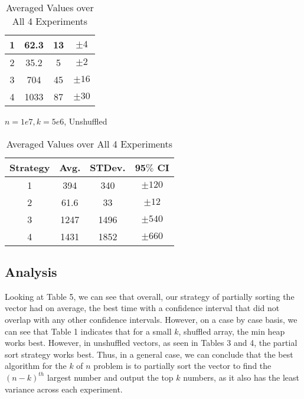 \documentclass[11pt]{article}
\begin{document}
\begin{table}[ht]
{\begin{tabular}{|c c c c|}
        1 &62.3 & 13 & $\pm 4$ \\ 
        \hline
        2 & 35.2 & 5 & $\pm 2$ \\
        \hline
        3 & 704 & 45 & $\pm 16$ \\
        \hline
        4 & 1033 & 87 & $\pm 30$\\
        \hline
       \end{tabular}
    \caption{$n = 1e7, k = 5e6$, Unshuffled}}
    \centering
    \begin{tabular}{|c c c c|} 
        \hline
        Strategy & Avg. & STDev. & 95$\%$ CI \\ [0.5ex]
        \hline
        1 &394 & 340 & $\pm 120$ \\ 
        \hline
        2 & 61.6 & 33 & $\pm 12$ \\
        \hline
        3 & 1247 & 1496 & $\pm 540$ \\
        \hline
        4 & 1431 & 1852 & $\pm 660$\\
        \hline
       \end{tabular}
       \vspace{-2mm}
    \caption{Averaged Values over All 4 Experiments}
\end{table}
\vspace{-8mm}

\subsection*{Analysis}
Looking at Table 5, we can see that overall, our strategy of partially sorting the vector had on average, the best time with a confidence interval that did not overlap with any other confidence intervals. However, on a case by case basis,
we can see that Table 1 indicates that for a small $k$, shuffled array, the min heap works best. However, in unshuffled vectors, as seen in Tables 3 and 4, the partial sort strategy works best. Thus, in a general case, we can conclude that the 
best algorithm for the $k$ of $n$ problem is to partially sort the vector to find the $(n-k)^{th}$ largest number and output the top $k$ numbers, as it also has the least variance across each experiment.
\end{document}
